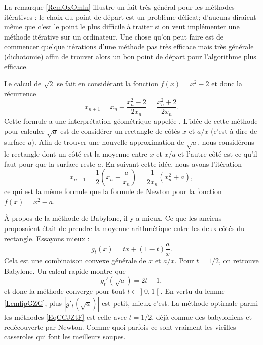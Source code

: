 La remarque \ref{RemOxOmln} illustre un fait très général pour les méthodes itératives : le choix du point de départ est un problème délicat; d'aucuns diraient même que c'est le point le plus difficile à traiter si on veut implémenter une méthode itérative sur un ordinateur. Une chose qu'on peut faire est de commencer quelque itérations d'une méthode pas très efficace mais très générale (dichotomie) affin de trouver alors un bon point de départ pour l'algorithme plus efficace.

\begin{example}
    Le calcul de \( \sqrt{2}\) se fait en considérant la fonction \( f(x)=x^2-2\) et donc la récurrence 
    \begin{equation}
        x_{n+1}=x_n-\frac{ x_n^2-2 }{ 2x_n }=\frac{ x_n^2+2 }{ 2x_n }.
    \end{equation}
    Cette formule a une interprétation géométrique appelée . L'idée de cette méthode pour calculer \( \sqrt{a}\) est de considérer un rectangle de côtés \( x\) et \( a/x\) (c'est à dire de surface \( a\)). Afin de trouver une nouvelle approximation de \( \sqrt{a}\), nous considérons le rectangle dont un côté est la moyenne entre \( x\) et \( x/a\) et l'autre côté est ce qu'il faut pour que la surface reste \( a\). En suivant cette idée, nous avons l'itération
    \begin{equation}
        x_{n+1}=\frac{ 1 }{2}(x_n+\frac{ a }{ x_n })=\frac{1}{ 2x_n }(x_n^2+a),
    \end{equation}
    ce qui est la même formule que la formule de Newton pour la fonction \( f(x)=x^2-a\).
\end{example}

À propos de la méthode de Babylone, il y a mieux. Ce que les anciens proposaient était de prendre la moyenne arithmétique entre les deux côtés du rectangle. Essayons mieux :
\begin{equation}    \label{EqCCJZtF}
    g_t(x)=tx+(1-t)\frac{ a }{ x }.
\end{equation}
Cela est une combinaison convexe générale de \( x\) et \( a/x\). Pour \( t=1/2\), on retrouve Babylone. Un calcul rapide montre que
\begin{equation}
    g_t'(\sqrt{a})=2t-1,
\end{equation}
et donc la méthode converge pour tout \( t\in\mathopen] 0 , 1 \mathclose[\). En vertu du lemme \ref{LemfipGZG}, plus \( | g'_t(\sqrt{a}) |\) est petit, mieux c'est. La méthode optimale parmi les méthodes \eqref{EqCCJZtF} est celle avec \( t=1/2\), déjà connue des babyloniens et redécouverte par Newton. Comme quoi parfois ce sont vraiment les vieilles casseroles qui font les meilleurs soupes.

